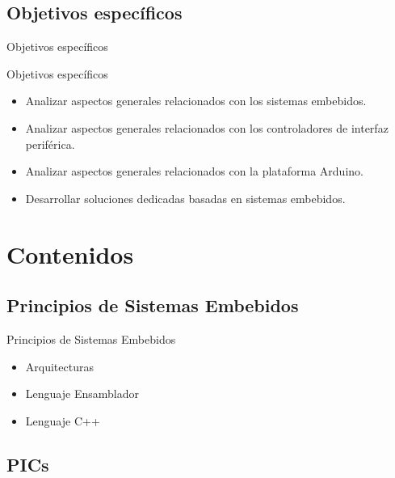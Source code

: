 \documentclass[handout,xcolor=dvipsnames]{beamer}
\newcommand{\pageframe}[1]{\frame{\begin{center}{ \Huge #1 }\end{center}}}
\begin{document}
\subsection{Objetivos específicos}

\begin{frame}{Objetivos específicos}
  \begin{block}{Objetivos específicos}
    \begin{itemize}
      \item<1> Analizar aspectos generales relacionados con los sistemas embebidos.
      \item<1> Analizar aspectos generales relacionados con los controladores de interfaz periférica.
      \item<1> Analizar aspectos generales relacionados con la plataforma Arduino.
      \item<1> Desarrollar soluciones dedicadas basadas en sistemas embebidos.
    \end{itemize}
  \end{block}
\end{frame}


\section{Contenidos}

\pageframe{Contenidos}

\subsection[Principios]{Principios de Sistemas Embebidos}

\begin{frame}{Principios de Sistemas Embebidos}
  \begin{block}{}
  \begin{itemize}
    \item Arquitecturas
    \item Lenguaje Ensamblador
    \item Lenguaje C++
  \end{itemize}
  \end{block}
\end{frame}

\subsection[PICs]{PICs}
\end{document}
